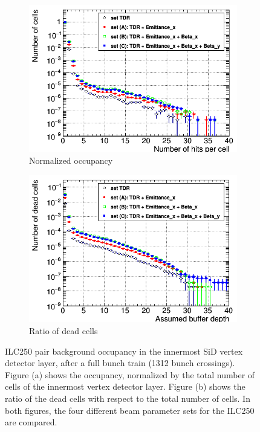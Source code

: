  \begin{figure}[h]
 \centering
  \begin{subfigure}[b]{0.49\textwidth}
   \centering
    \includegraphics[width=\textwidth]{Figures/Pairs/Occupancy_Comparison_Layer_0_numcells_ILC250_Comparison_ALL_SETS_5T_w_antiDiD_LEG.png}
   \caption{Normalized occupancy}
   \end{subfigure}
   \hfill
    \begin{subfigure}[b]{0.49\textwidth}
   \centering
    \includegraphics[width=\textwidth]{Figures/Pairs/Occupancy_Comparison_Layer_0_deadcells_ILC250_Comparison_ALL_SETS_5T_w_antiDiD_LEG.png}
   \caption{Ratio of dead cells}
   \end{subfigure}
   \caption[Pair background occupancy in the SiD vertex detector layer 0 for the ILC250]{ILC250 pair background occupancy in the innermost SiD vertex detector layer, after a full bunch train (1312 bunch crossings).
   Figure (a) shows the occupancy, normalized by the total number of cells of the innermost vertex detector layer.
   Figure (b) shows the ratio of the dead cells with respect to the total number of cells.
   In both figures, the four different beam parameter sets for the ILC250 are compared.
   }
   \label{fig:PairBkg:ILC250_Occupancy_Layer0}
 \end{figure}

